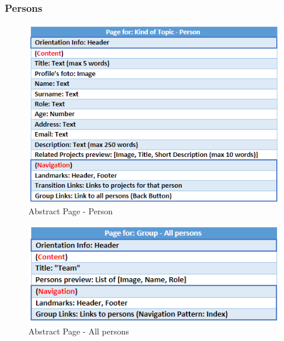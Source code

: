 \documentclass[11pt, letterpaper]{article}
\begin{document}
\subsubsection{Persons}
\begin{figure}[H]
    \centering
    \includegraphics[width=15cm]{images/Abstract Pages/AB - Person.png}
    \caption{Abstract Page - Person}
    \label{fig:AbstractPage_Person}
\end{figure}

\begin{figure}[H]
    \centering
    \includegraphics[width=15cm]{images/Abstract Pages/AB - All persons.png}
    \caption{Abstract Page - All persons}
    \label{fig:AbstractPage_All_persons}
\end{figure}
\end{document}

